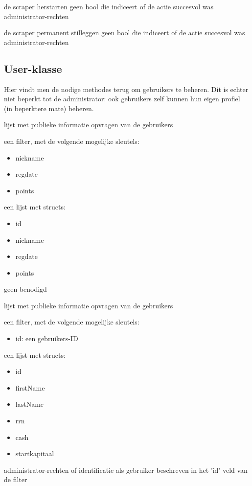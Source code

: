 	{ de scraper herstarten }
	{ geen }
	{ bool die indiceert of de actie succesvol was }
	{ administrator-rechten }

	{ de scraper permanent stilleggen }
	{ geen }
	{ bool die indiceert of de actie succesvol was }
	{ administrator-rechten }


\subsection{User-klasse}

Hier vindt men de nodige methodes terug om gebruikers te beheren. Dit is echter niet beperkt tot de administrator: ook gebruikers zelf kunnen hun eigen profiel (in beperktere mate) beheren.

	{ lijst met publieke informatie opvragen van de gebruikers }
	{ een filter, met de volgende mogelijke sleutels:
		\begin{itemize}
		\item{nickname}
		\item{regdate}
		\item{points}
		\end{itemize} }
	{ een lijst met structs:
		\begin{itemize}
		\item{id}
		\item{nickname}
		\item{regdate}
		\item{points}
		\end{itemize} }
	{ geen benodigd }

	{ lijst met publieke informatie opvragen van de gebruikers }
	{ een filter, met de volgende mogelijke sleutels:
		\begin{itemize}
		\item{id: een gebruikers-ID}
		\end{itemize} }
	{ een lijst met structs:
		\begin{itemize}
		\item{id}
		\item{firstName}
		\item{lastName}
		\item{rrn}
		\item{cash}
		\item{startkapitaal}
		\end{itemize} }
	{ administrator-rechten of identificatie als gebruiker beschreven in het 'id' veld van de filter }


